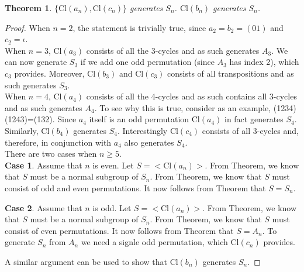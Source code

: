 \documentclass[a4paper,10pt]{article}
\newtheorem{theorem}{Theorem}
\begin{document}
\begin{theorem}
$\{\textrm{Cl}(a_n),\textrm{Cl}(c_n)\}$ generates $S_n$. $\textrm{Cl}(b_n)$ generates $S_n$. 
\end{theorem}
\begin{proof}
When $n=2$, the statement is trivially true, since $a_2 = b_2 = (01)$ and $c_2 = \iota$. \\

When $n=3$, $\textrm{Cl}(a_3)$ consists of all the 3-cycles and as such generates $A_3$. We can now generate $S_3$ if we add one odd permutation (since $A_3$ has index 2), which $c_3$ provides. Moreover, $\textrm{Cl}(b_3)$ and $\textrm{Cl}(c_3)$ consists of all transpositions and as such generates $S_3$.\\

When $n=4$, $\textrm{Cl}(a_4)$ consists of all the 4-cycles and as such contains all 3-cycles and as such generates $A_4$. To see why this is true, consider as an example, (1234)(1243)=(132). Since $a_4$ itself is an odd permutation $\textrm{Cl}(a_4)$ in fact generates $S_4$. Similarly, $\textrm{Cl}(b_4)$ generates $S_4$. Interestingly $\textrm{Cl}(c_4)$ consists of all 3-cycles and, therefore, in conjunction with $a_4$ also generates $S_4$.\\

There are two cases when $n\geq 5$.\\

\textbf{Case 1}. Assume that $n$ is even. Let $S=<\textrm{Cl}(a_n)>$. From Theorem, we know that $S$ must be a normal subgroup of $S_n$. From Theorem, we know that $S$ must consist of odd and even permutations. It now follows from Theorem that $S=S_n$.

\textbf{Case 2}. Assume that $n$ is odd. Let $S=<\textrm{Cl}(a_n)>$. From Theorem, we know that $S$ must be a normal subgroup of $S_n$. From Theorem, we know that $S$ must consist of even permutations. It now follows from Theorem that $S=A_n$. To generate $S_n$ from $A_n$ we need a signle odd permutation, which $\textrm{Cl}(c_n)$ provides.  

A similar argument can be used to show that $\textrm{Cl}(b_n)$ generates $S_n$.
\end{proof}
\end{document}
